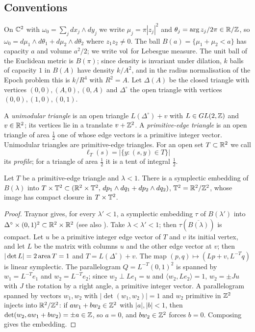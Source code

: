 \documentclass[11pt]{amsart}
\begin{document}
\subsection{Conventions}
On $\mathbb{C}^2$ with $\omega_0=\sum_j dx_j\wedge dy_j$ we write $\mu_j=\pi|z_j|^2$ and $\theta_j=\arg z_j/2\pi\in\mathbb{R}/\mathbb{Z}$, so
$\omega_0=d\mu_1\wedge d\theta_1+d\mu_2\wedge d\theta_2$ where $z_1z_2\ne0$. The ball $B(a)=\{\mu_1+\mu_2<a\}$ has
capacity $a$ and volume $a^2/2$; we write $\operatorname{vol}$ for Lebesgue measure. The unit ball of the Euclidean metric is
$B(\pi)$; since density is invariant under dilation, $k$ balls of capacity $1$ in $B(A)$ have density $k/A^2$, and
in the radius normalisation of the Epoch problem \cite{Epoch} this is $k/R^4$ with $R^2=A$. Let $\Delta(A)$ be the
closed triangle with vertices $(0,0),(A,0),(0,A)$ and $\Delta^\circ$ the open triangle with vertices
$(0,0),(1,0),(0,1)$.

A \emph{unimodular triangle} is an open triangle $L(\Delta^\circ)+v$ with $L\in GL(2,\mathbb{Z})$ and $v\in\mathbb{R}^2$; its
vertices lie in a translate $v+\mathbb{Z}^2$. A \emph{primitive-edge triangle} is an open triangle of area $\frac12$ one of whose
edge vectors is a primitive integer vector. Unimodular triangles are primitive-edge triangles. For an open set
$T\subset\mathbb{R}^2$ we call
\[
\ell_T(s)=\bigl|\{y:(s,y)\in T\}\bigr|
\]
its \emph{profile}; for a triangle of area $\frac12$ it is a tent of integral $\frac12$.

\begin{lemma}[Traynor]\label{lem:traynor}
Let $T$ be a primitive-edge triangle and $\lambda<1$. There is a symplectic embedding of $B(\lambda)$ into
$T\times\mathbb{T}^2\subset(\mathbb{R}^2\times\mathbb{T}^2,\,dp_1\wedge dq_1+dp_2\wedge dq_2)$, $\mathbb{T}^2=\mathbb{R}^2/\mathbb{Z}^2$, whose image has compact
closure in $T\times\mathbb{T}^2$.
\end{lemma}

\begin{proof}
Traynor \cite{Traynor1995} gives, for every $\lambda'<1$, a symplectic embedding $\tau$ of $B(\lambda')$ into
$\Delta^\circ\times(0,1)^2\subset\mathbb{R}^2\times\mathbb{R}^2$ (see also \cite[\S4.1, Lemma~4.2]{SchlenkHand}).
Take $\lambda<\lambda'<1$; then $\tau(\overline{B(\lambda)})$ is compact. Let $u$ be a primitive integer edge vector
of $T$ and $v$ its initial vertex, and let $L$ be the matrix with columns $u$ and the other edge vector at $v$;
then $|\det L|=2\operatorname{area} T=1$ and $T=L(\Delta^\circ)+v$. The map $(p,q)\mapsto(Lp+v,L^{-T}q)$ is linear symplectic. The
parallelogram $Q=L^{-T}(0,1)^2$ is spanned by $w_1=L^{-T}e_1$ and $w_2=L^{-T}e_2$; since $w_2\perp Le_1=u$ and
$\langle w_2,Le_2\rangle=1$, $w_2=\pm Ju$ with $J$ the rotation by a right angle, a primitive integer vector. A
parallelogram spanned by vectors $w_1,w_2$ with $|\det(w_1,w_2)|=1$ and $w_2$ primitive in $\mathbb{Z}^2$ injects into
$\mathbb{R}^2/\mathbb{Z}^2$: if $aw_1+bw_2\in\mathbb{Z}^2$ with $|a|,|b|<1$, then $\det(w_2,aw_1+bw_2)=\pm a\in\mathbb{Z}$, so $a=0$, and $bw_2\in\mathbb{Z}^2$
forces $b=0$. Composing gives the embedding.
\end{proof}
\end{document}
